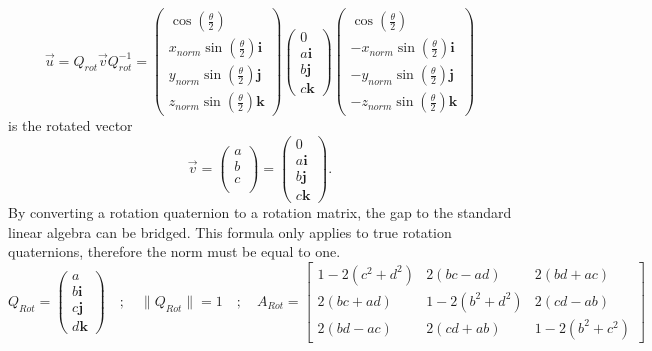 \begin{equation*}
    \vec{u} = Q_{rot}\vec{v}Q_{rot}^{-1}=\begin{pmatrix}
        \cos (\frac{\theta}{2} )                 \\
        x_{norm}\sin(\frac{\theta}{2})\textbf{i} \\
        y_{norm}\sin(\frac{\theta}{2})\textbf{j} \\
        z_{norm}\sin(\frac{\theta}{2})\textbf{k}
    \end{pmatrix}
    \begin{pmatrix}
        0           \\
        a\textbf{i} \\
        b\textbf{j} \\
        c\textbf{k}
    \end{pmatrix}
    \begin{pmatrix}
        \cos (\frac{\theta}{2} )                  \\
        -x_{norm}\sin(\frac{\theta}{2})\textbf{i} \\
        -y_{norm}\sin(\frac{\theta}{2})\textbf{j} \\
        -z_{norm}\sin(\frac{\theta}{2})\textbf{k}
    \end{pmatrix}
\end{equation*}
is the rotated vector
\begin{equation*}
\vec{v} =
\begin{pmatrix}
    a \\
    b \\
    c \\
\end{pmatrix}
=
\begin{pmatrix}
    0           \\
    a\textbf{i} \\
    b\textbf{j} \\
    c\textbf{k}
\end{pmatrix}.
\end{equation*}
By converting a rotation quaternion to a rotation matrix, the gap to the standard linear algebra can be bridged. This formula only applies to true rotation quaternions, therefore the norm must be equal to one. 
\begin{equation*}
    Q_{Rot}=    \begin{pmatrix}
        a           \\
        b\textbf{i} \\
        c\textbf{j} \\
        d\textbf{k}
    \end{pmatrix}
    \quad ; \quad
    \lVert Q_{Rot} \rVert = 1
    \quad ; \quad
    A_{Rot}
    =
    \begin{bmatrix}
        1-2(c^{2}+d^{2}) & 2(bc-ad) & 2(bd+ac) \\
        2(bc+ad) & 1-2(b^{2}+d^{2}) & 2(cd-ab) \\
        2(bd-ac) & 2(cd+ab) & 1-2(b^{2}+c^{2})
    \end{bmatrix}
\end{equation*}
